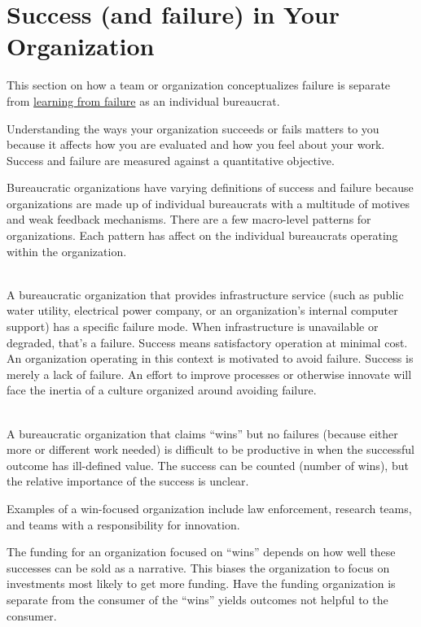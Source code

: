 \section{Success (and failure) in Your Organization\label{sec:org-failure-and-success}}

This section on how a team or organization conceptualizes failure is separate from %
\hyperref[sec:learn-from-failure]{learning from failure} 
as an individual bureaucrat. 

Understanding the ways your organization succeeds or fails matters to you because it affects how you are evaluated and how you feel about your work. Success and failure are measured against a quantitative objective. 


Bureaucratic organizations have varying definitions of success and failure because organizations are made up of individual bureaucrats with a multitude of motives and weak feedback mechanisms. There are a few macro-level patterns for organizations. Each pattern has affect on the individual bureaucrats operating within the organization. 

\ \\

A bureaucratic organization that provides infrastructure service (such as public water utility, electrical power company, or an organization's internal computer support) has a specific failure mode. When infrastructure is unavailable or degraded, that's a failure. Success means satisfactory operation at minimal cost. An organization operating in this context is motivated to avoid failure. Success is merely a lack of failure. An effort to improve processes or otherwise innovate will face the inertia of a culture organized around avoiding failure. 

\ \\

A bureaucratic organization that claims ``wins'' but no failures (because either more or different work needed) is difficult to be productive in when the successful outcome has ill-defined value. The success can be counted (number of wins), but the relative importance of the success is unclear.

Examples of a win-focused organization include law enforcement, research teams, and teams with a responsibility for innovation. 

The funding for an organization focused on ``wins'' depends on how well these successes can be sold as a narrative. This biases the organization to focus on investments most likely to get more funding. Have the funding organization is separate from the consumer of the ``wins'' yields outcomes not helpful to the consumer.

\ \\

